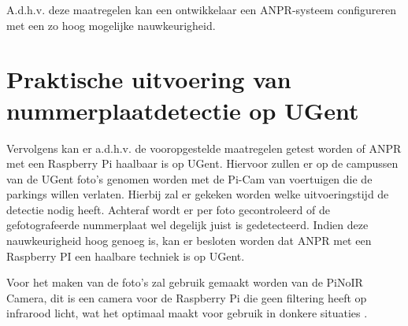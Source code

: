 A.d.h.v. deze maatregelen kan een ontwikkelaar een ANPR-systeem configureren met een zo hoog mogelijke nauwkeurigheid.

\section{Praktische uitvoering van nummerplaatdetectie op UGent}
Vervolgens kan er a.d.h.v. de vooropgestelde maatregelen getest worden of ANPR met een Raspberry Pi haalbaar is op UGent. Hiervoor zullen er op de campussen van de UGent foto's genomen worden met de Pi-Cam van voertuigen die de parkings willen verlaten. Hierbij zal er gekeken worden welke uitvoeringstijd de detectie nodig heeft. Achteraf wordt er per foto gecontroleerd of de gefotografeerde nummerplaat wel degelijk juist is gedetecteerd. Indien deze nauwkeurigheid hoog genoeg is, kan er besloten worden dat ANPR met een Raspberry PI een haalbare techniek is op UGent.

Voor het maken van de foto's zal gebruik gemaakt worden van de PiNoIR Camera, dit is een camera voor de Raspberry Pi die geen filtering heeft op infrarood licht, wat het optimaal maakt voor gebruik in donkere situaties \autocite{raspberrypisitemodelpinoir}.